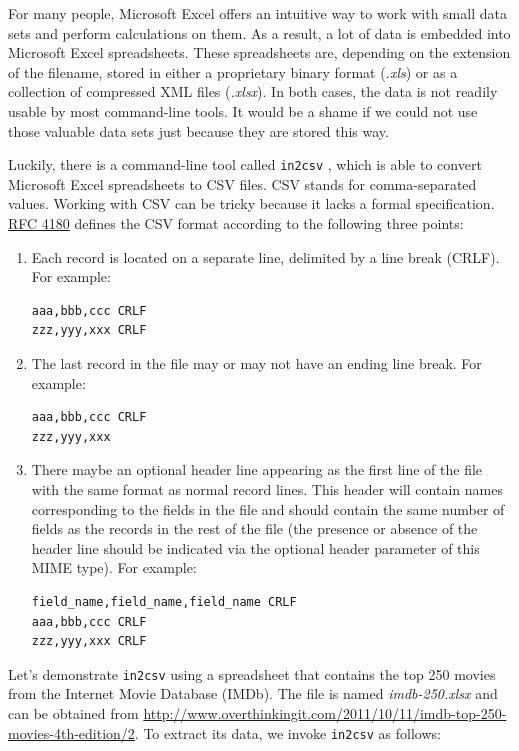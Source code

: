 \documentclass[
]{book}
\theoremstyle{definition}
\theoremstyle{definition}
\theoremstyle{definition}
\theoremstyle{remark}
\begin{document}
For many people, Microsoft Excel offers an intuitive way to work with small data sets and perform calculations on them. As a result, a lot of data is embedded into Microsoft Excel spreadsheets. These spreadsheets are, depending on the extension of the filename, stored in either a proprietary binary format (\emph{.xls}) or as a collection of compressed XML files (\emph{.xlsx}). In both cases, the data is not readily usable by most command-line tools. It would be a shame if we could not use those valuable data sets just because they are stored this way.

Luckily, there is a command-line tool called \texttt{in2csv} \citep{in2csv}, which is able to convert Microsoft Excel spreadsheets to CSV files. CSV stands for comma-separated values. Working with CSV can be tricky because it lacks a formal specification. \href{http://www.ietf.org/rfc/rfc4180.txt}{RFC 4180} defines the CSV format according to the following three points:

\begin{enumerate}
\def\labelenumi{\arabic{enumi}.}
\item
  Each record is located on a separate line, delimited by a line break (CRLF). For example:

\begin{verbatim}
aaa,bbb,ccc CRLF
zzz,yyy,xxx CRLF
\end{verbatim}
\item
  The last record in the file may or may not have an ending line break. For example:

\begin{verbatim}
aaa,bbb,ccc CRLF
zzz,yyy,xxx
\end{verbatim}
\item
  There maybe an optional header line appearing as the first line of the file with the same format as normal record lines. This header will contain names corresponding to the fields in the file and should contain the same number of fields as the records in the rest of the file (the presence or absence of the header line should be indicated via the optional header parameter of this MIME type). For example:

\begin{verbatim}
field_name,field_name,field_name CRLF
aaa,bbb,ccc CRLF
zzz,yyy,xxx CRLF
\end{verbatim}
\end{enumerate}

Let's demonstrate \texttt{in2csv} using a spreadsheet that contains the top 250 movies from the Internet Movie Database (IMDb). The file is named \emph{imdb-250.xlsx} and can be obtained from \url{http://www.overthinkingit.com/2011/10/11/imdb-top-250-movies-4th-edition/2}. To extract its data, we invoke \texttt{in2csv} as follows:
\end{document}
